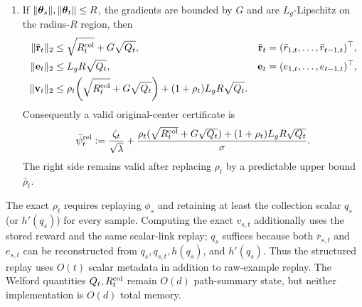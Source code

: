\begin{lemma}
\begin{enumerate}[nosep,label=(\alph*),leftmargin=1.6em]
\item If $\|\boldsymbol{\theta}_s\|,\|\boldsymbol{\theta}_t\|\le R$, the gradients are bounded by
$G$ and are $L_g$-Lipschitz on the radius-$R$ region, then
\begin{align}
 \|\bar{\mathbf r}_t\|_2
 &\le\sqrt{R_t^{\rm col}}+G\sqrt{Q_t},
 &\bar{\mathbf r}_t&=(\bar r_{1,t},\ldots,\bar r_{t-1,t})^\top,
 \label{eq:relative-link-rbar}\\
 \|\mathbf e_t\|_2
 &\le L_gR\sqrt{Q_t},
 &\mathbf e_t&=(e_{1,t},\ldots,e_{t-1,t})^\top,
 \label{eq:relative-link-e}\\
 \|\mathbf{v}_t\|_2
 &\le \rho_t\!\left(\sqrt{R_t^{\rm col}}+G\sqrt{Q_t}\right)
 +(1+\rho_t)L_gR\sqrt{Q_t}.
 \label{eq:relative-link-v-bound}
\end{align}
Consequently a valid original-center certificate is
\begin{equation}\label{eq:relative-link-psi}
 \bar\psi_t^{\rm rel}:=\frac{\zeta_t}{\sqrt\lambda}
 +\frac{\rho_t(\sqrt{R_t^{\rm col}}+G\sqrt{Q_t})
 +(1+\rho_t)L_gR\sqrt{Q_t}}{\sigma}.
\end{equation}
The right side remains valid after replacing $\rho_t$ by a predictable upper
bound $\bar\rho_t$.
\end{enumerate}
The exact $\rho_t$ requires replaying $\phi_s$ and retaining at least the
collection scalar $q_s$ (or $h'(q_s)$) for every sample.  Computing the exact
$v_{s,t}$ additionally uses the stored reward and the same scalar-link replay;
$q_s$ suffices because both $\bar r_{s,t}$ and $e_{s,t}$ can be reconstructed
from $q_s,q_{s,t},h(q_s)$, and $h'(q_s)$.  Thus the structured replay uses
$O(t)$ scalar metadata in addition to raw-example replay.  The Welford
quantities $Q_t,R_t^{\rm col}$ remain $O(d)$ path-summary state, but neither
implementation is $O(d)$ total memory.
\end{lemma}
